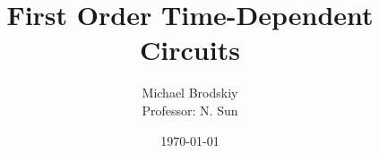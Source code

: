 


\title{First Order Time-Dependent Circuits}
\date{\today}
\author{Michael Brodskiy\\ \small Professor: N. Sun}



\maketitle

